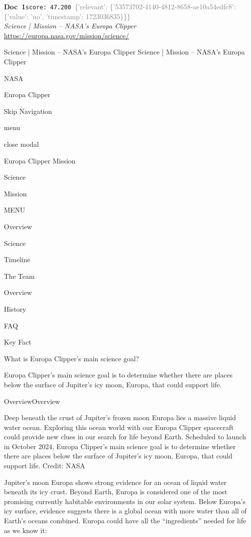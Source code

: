 \documentclass[a4paper,11pt]{article}
\begin{document}
\begin{docenv}
{\footnotesize\textcolor{doccolor}{\textbf{Doc~1}}}\hfill{\tiny\texttt{score:~47.200}}\ {\tiny\textcolor{gray}{\{'relevant': \{'53573702-4140-4812-8658-ae10a54edfc8': \{'value': 'no', 'timestamp': 1723036835\}\}\}}}\\[3pt]
{\small\textit{Science | Mission – NASA's Europa Clipper}}\\[2pt]
{\tiny\url{https://europa.nasa.gov/mission/science/}}\\[4pt]
{\footnotesize Science | Mission – NASA's Europa Clipper
Science | Mission – NASA's Europa Clipper

NASA

Europa Clipper

Skip Navigation

menu

close modal

Europa Clipper Mission

Science

Mission

MENU

Overview

Science

Timeline

The Team

Overview

History

FAQ

Key Fact

What is Europa Clipper's main science goal? 

Europa Clipper’s main science goal is to determine whether there are places below the surface of Jupiter’s icy moon, Europa, that could support life.

OverviewOverview

Deep beneath the crust of Jupiter’s frozen moon Europa lies a massive liquid water ocean. Exploring this ocean world with our Europa Clipper spacecraft could provide new clues in our search for life beyond Earth. Scheduled to launch in October 2024, Europa Clipper’s main science goal is to determine whether there are places below the surface of Jupiter’s icy moon, Europa, that could support life. Credit: NASA

Jupiter’s moon Europa shows strong evidence for an ocean of liquid water beneath its icy crust. Beyond Earth, Europa is considered one of the most promising currently habitable environments in our solar system. 
Below Europa’s icy surface, evidence suggests there is a global ocean with more water than all of Earth’s oceans combined. Europa could have all the “ingredients” needed for life as we know it: 

}
\end{docenv}
\end{document}
